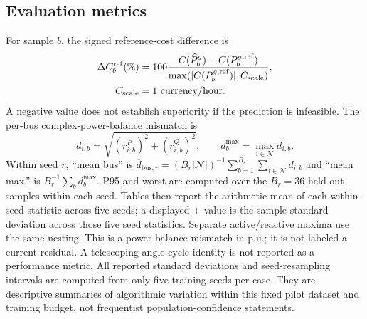 \documentclass[final,5p,times,twocolumn]{elsarticle}
\newcommand{\Nset}{\mathcal{N}}
\begin{document}
\subsection{Evaluation metrics}

For sample $b$, the signed reference-cost difference is
\begin{equation}
  \begin{aligned}
    \Delta C_b^{\mathrm{ref}}(\%)
    &=
    100
    \frac{C(\widehat P_b^g)-C(P_b^{g,\mathrm{ref}})}
    {\max(|C(P_b^{g,\mathrm{ref}})|,C_{\mathrm{scale}})},\\
    C_{\mathrm{scale}}&=1\ {\rm currency/hour}.
  \end{aligned}
  \label{eq:reference_cost_difference}
\end{equation}
A negative value does not establish superiority if the prediction is
infeasible. The per-bus complex-power-balance mismatch is
\begin{equation}
  d_{i,b}=\sqrt{(r^P_{i,b})^2+(r^Q_{i,b})^2},
  \qquad
  d_b^{\max}=\max_{i\in\Nset}d_{i,b}.
  \label{eq:balance_metric}
\end{equation}
Within seed $r$, ``mean bus'' is
$\overline d_{\mathrm{bus},r}=(B_r|\Nset|)^{-1}
\sum_{b=1}^{B_r}\sum_{i\in\Nset}d_{i,b}$ and ``mean max.'' is
$B_r^{-1}\sum_b d_b^{\max}$. P95 and worst are computed over the $B_r=36$
held-out samples within each seed. Tables then report the arithmetic mean of
each within-seed statistic across five seeds; a displayed $\pm$ value is the
sample standard deviation across those five seed statistics. Separate
active/reactive maxima use the same nesting. This is a power-balance mismatch
in p.u.; it is not labeled a current residual. A
telescoping angle-cycle identity is not reported as a performance metric.
All reported standard deviations and seed-resampling intervals are computed
from only five training seeds per case. They are descriptive summaries of
algorithmic variation within this fixed pilot dataset and training budget, not
frequentist population-confidence statements.
\end{document}
